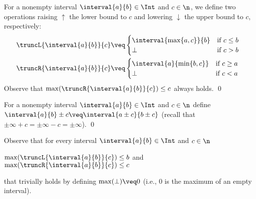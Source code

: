 \begin{definition}
  \label{de:trunc}
  For a nonempty interval \(\interval{a}{b} \in \Int\) and \(c \in \n\), we define
  two operations raising \(\uparrow\) the lower bound to \(c\) and lowering \(\downarrow\) the upper
  bound to \(c\), respectively:
  \begin{align*}
    &\truncL{\interval{a}{b}}{c} \veq 
      \begin{cases} 
        \interval{\max\{a,c\}}{b} & \text{if } c\leq b\\
        \bot & \text{if } c > b
      \end{cases}
    \\
    &\truncR{\interval{a}{b}}{c} \veq 
      \begin{cases}   
        \interval{a}{\min\{b,c\}} & \text{if } c\geq a\\
        \bot & \text{if } c < a 
      \end{cases} 
  \end{align*}
  Observe that \(\max(\truncR{\interval{a}{b}}{c})\leq c\) always holds. \qed   
\end{definition}

\begin{definition}
  For a nonempty interval \(\interval{a}{b} \in \Int\) and
  \(c \in \n\) define
  \(\interval{a}{b} \pm c \veq \interval{a\pm c}{b\pm c}\) (recall
  that \(\pm \infty + c = \pm\infty - c = \pm\infty\)).  \qed
\end{definition}


Observe that for every interval \(\interval{a}{b} \in \Int\) and
\(c \in \n\)
\begin{center}
  \(\max(\truncL{\interval{a}{b}}{c}) \leq b\)
  \qquad and \qquad
  \(\max(\truncR{\interval{a}{b}}{c}) \leq c\)
\end{center}
that trivially holds by 
defining \(\max (\bot)  \veq 0\) (i.e., \(0\) is the maximum of
an empty interval).

